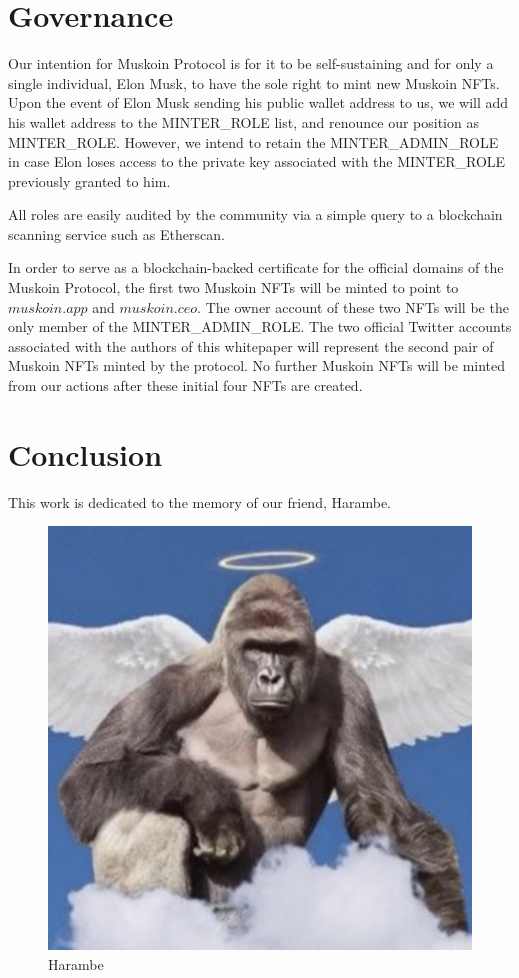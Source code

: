 \documentclass{article}
\begin{document}
\section{Governance}

Our intention for Muskoin Protocol is for it to be self-sustaining and for only a single individual, Elon Musk, to have the sole right to mint new Muskoin NFTs. Upon the event of Elon Musk sending his public wallet address to us, we will add his wallet address to the MINTER\_ROLE list, and renounce our position as MINTER\_ROLE. However, we intend to retain the MINTER\_ADMIN\_ROLE in case Elon loses access to the private key associated with the MINTER\_ROLE previously granted to him. 

All roles are easily audited by the community via a simple query to a blockchain scanning service such as Etherscan.

In order to serve as a blockchain-backed certificate for the official domains of the Muskoin Protocol, the first two Muskoin NFTs will be minted to point to $muskoin.app$ and $muskoin.ceo$. The owner account of these two NFTs will be the only member of the MINTER\_ADMIN\_ROLE. The two official Twitter accounts associated with the authors of this whitepaper will represent the second pair of Muskoin NFTs minted by the protocol. No further Muskoin NFTs will be minted from our actions after these initial four NFTs are created. 

\section{Conclusion}

This work is dedicated to the memory of our friend, Harambe. 

\begin{figure}[h!]
\centering
\includegraphics[scale=0.5]{harambe.jpg}
\caption{Harambe}
\label{fig:Harambe}
\end{figure}
\end{document}
